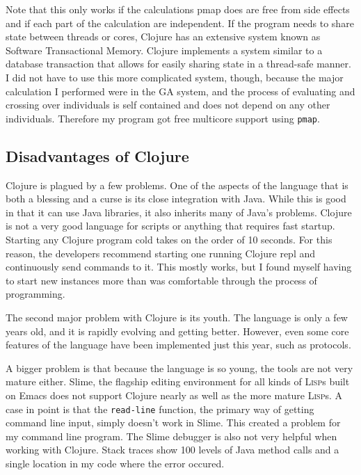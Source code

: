 \documentclass{article}
\begin{document}
Note that this only works if the calculations pmap does are free from side
effects and if each part of the calculation are independent.  If the program
needs to share state between threads or cores, Clojure has an extensive system
known as Software Transactional Memory.  Clojure implements a system similar to
a database transaction that allows for easily sharing state in a thread-safe
manner.  I did not have to use this more complicated system, though, because
the major calculation I performed were in the GA system, and the process of
evaluating and crossing over individuals is self contained and does not depend
on any other individuals.  Therefore my program got free multicore support
using \texttt{pmap}.

\subsection{Disadvantages of Clojure}

Clojure is plagued by a few problems.  One of the aspects of the language that
is both a blessing and a curse is its close integration with Java.  While this
is good in that it can use Java libraries, it also inherits many of Java's
problems.  Clojure is not a very good language for scripts or anything that
requires fast startup.  Starting any Clojure program cold takes on the order of
10 seconds.  For this reason, the developers recommend starting one running
Clojure repl and continuously send commands to it.  This mostly works, but I
found myself having to start new instances more than was comfortable through the
process of programming.

The second major problem with Clojure is its youth.  The language is only
a few years old, and it is rapidly evolving and getting better.  However, even
some core features of the language have been implemented just this year, such as
protocols.

A bigger problem is that because the language is so young, the tools are not
very mature either.  Slime, the flagship editing environment for all kinds of
\textsc{Lisp}s built on Emacs does not support Clojure nearly as well as the more mature
\textsc{Lisp}s.  A case in point is that the \texttt{read-line} function, the primary way of
getting command line input, simply doesn't work in Slime.  This created a
problem for my command line program.  The Slime debugger is also not very
helpful when working with Clojure.  Stack traces show 100 levels of Java
method calls and a single location in my code where the error occured.
\end{document}
